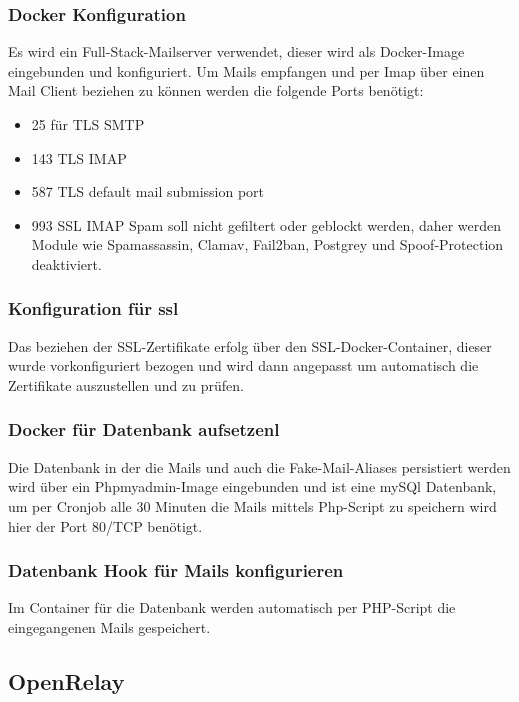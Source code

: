 \documentclass[a4paper,11pt,singlespacing]{article}
\begin{document}
		\subsubsection{Docker Konfiguration}\label{Mail-In-Container}
			Es wird ein Full-Stack-Mailserver verwendet, dieser wird als Docker-Image eingebunden und konfiguriert. Um Mails empfangen und per Imap über einen Mail Client beziehen zu können werden die folgende Ports benötigt:
		\begin{itemize}
			\item
				25 für TLS SMTP
			\item
				143 TLS IMAP
			\item
				587 TLS default mail submission port
			\item
				993 SSL IMAP
			Spam soll nicht gefiltert oder geblockt werden, daher werden Module wie Spamassassin, Clamav, Fail2ban, Postgrey und Spoof-Protection deaktiviert.
		\end{itemize}
			
		\subsubsection{Konfiguration für ssl}\label{SSl-Container}
			Das beziehen der SSL-Zertifikate erfolg über den SSL-Docker-Container, dieser wurde vorkonfiguriert bezogen und wird dann angepasst um automatisch die Zertifikate auszustellen und zu prüfen.

		\subsubsection{Docker für Datenbank aufsetzenl}\label{DB-Container}
			Die Datenbank in der die Mails und auch die Fake-Mail-Aliases persistiert werden wird über ein Phpmyadmin-Image eingebunden und ist eine mySQl Datenbank, um  per Cronjob alle 30 Minuten die Mails mittels Php-Script zu speichern wird hier der Port 80/TCP benötigt. 

		\subsubsection{Datenbank Hook für Mails konfigurieren}\label{DB-Hook-Container}
			Im Container für die Datenbank werden automatisch per PHP-Script die eingegangenen Mails gespeichert.

	\subsection{OpenRelay}\label{sec:UmsetzungOpenRelay}
	
\end{document}
